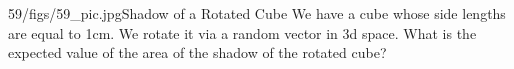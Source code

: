 \begin{problem}{59/figs/59_pic.jpg}{Shadow of a Rotated Cube}  We have a cube whose side lengths are equal to 1cm. We  rotate it via a random vector in 3d space. What is the expected value of the area of the shadow of the rotated cube?
\end{problem}